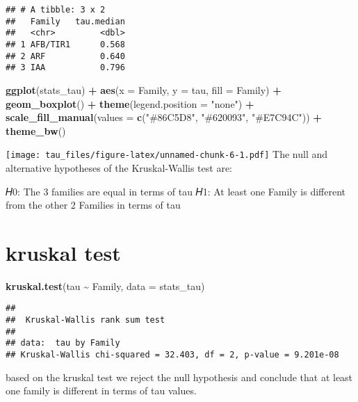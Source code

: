 \documentclass[
]{article}
\newenvironment{Shaded}{\begin{snugshade}}{\end{snugshade}}
\newcommand{\AttributeTok}[1]{\textcolor[rgb]{0.13,0.29,0.53}{#1}}
\newcommand{\FunctionTok}[1]{\textcolor[rgb]{0.13,0.29,0.53}{\textbf{#1}}}
\newcommand{\NormalTok}[1]{#1}
\newcommand{\SpecialCharTok}[1]{\textcolor[rgb]{0.81,0.36,0.00}{\textbf{#1}}}
\newcommand{\StringTok}[1]{\textcolor[rgb]{0.31,0.60,0.02}{#1}}
\begin{document}
\begin{verbatim}
## # A tibble: 3 x 2
##   Family   tau.median
##   <chr>         <dbl>
## 1 AFB/TIR1      0.568
## 2 ARF           0.640
## 3 IAA           0.796
\end{verbatim}

\begin{Shaded}
\begin{Highlighting}[]
\FunctionTok{ggplot}\NormalTok{(stats\_tau) }\SpecialCharTok{+}
  \FunctionTok{aes}\NormalTok{(}\AttributeTok{x =}\NormalTok{ Family, }\AttributeTok{y =}\NormalTok{ tau, }\AttributeTok{fill =}\NormalTok{ Family) }\SpecialCharTok{+}
  \FunctionTok{geom\_boxplot}\NormalTok{() }\SpecialCharTok{+}
  \FunctionTok{theme}\NormalTok{(}\AttributeTok{legend.position =} \StringTok{"none"}\NormalTok{) }\SpecialCharTok{+}
  \FunctionTok{scale\_fill\_manual}\NormalTok{(}\AttributeTok{values =} \FunctionTok{c}\NormalTok{(}\StringTok{"\#86C5D8"}\NormalTok{, }\StringTok{"\#620093"}\NormalTok{, }\StringTok{"\#E7C94C"}\NormalTok{)) }\SpecialCharTok{+}
  \FunctionTok{theme\_bw}\NormalTok{()}
\end{Highlighting}
\end{Shaded}

\texttt{[image: tau\_files/figure-latex/unnamed-chunk-6-1.pdf]} The null
and alternative hypotheses of the Kruskal-Wallis test are:

𝐻0: The 3 families are equal in terms of tau 𝐻1: At least one Family is
different from the other 2 Families in terms of tau

\hypertarget{kruskal-test}{%
\section{kruskal test}\label{kruskal-test}}

\begin{Shaded}
\begin{Highlighting}[]
\FunctionTok{kruskal.test}\NormalTok{(tau }\SpecialCharTok{\textasciitilde{}}\NormalTok{ Family, }\AttributeTok{data =}\NormalTok{ stats\_tau)}
\end{Highlighting}
\end{Shaded}

\begin{verbatim}
## 
##  Kruskal-Wallis rank sum test
## 
## data:  tau by Family
## Kruskal-Wallis chi-squared = 32.403, df = 2, p-value = 9.201e-08
\end{verbatim}

based on the kruskal test we reject the null hypothesis and conclude
that at least one family is different in terms of tau values.
\end{document}
